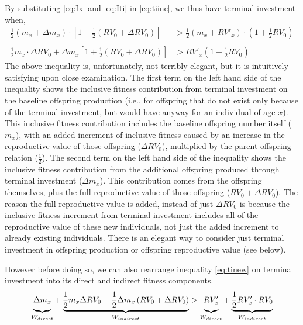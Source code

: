 \documentclass[12pt,review,authoryear]{elsarticle}
\begin{document}
By substituting \eqref{eq:Ix} and \eqref{eq:Iti} in \eqref{eq:tiine}, we thus have terminal investment when,
\begin{equation}\label{eq:tinew}
	\begin{split}
		\frac{1}{2} \left( m_x + \Delta m_{x} \right) \cdot \left[1 + \frac{1}{2} \left( RV_0 + \Delta RV_0 \right) \right] &> \frac{1}{2} \left( m_x + RV'_{x} \right) \cdot \left(1 + \frac{1}{2} RV_0 \right)
		\\ \\
		\frac{1}{2}m_x \cdot \Delta RV_{0} + \Delta m_{x} \left[1 + \frac{1}{2} \left( RV_0 + \Delta RV_0 \right) \right] &> RV'_{x} \left(1 + \frac{1}{2} RV_0 \right) 
	\end{split}
\end{equation} 
The above inequality is, unfortunately, not terribly elegant, but it is intuitively satisfying upon close examination. The first term on the left hand side of the inequality shows the inclusive fitness contribution from terminal investment on the baseline offspring production (i.e., for offspring that do not exist only because of the terminal investment, but would have anyway for an individual of age $x$). This inclusive fitness contribution includes the baseline offspring number itself ($m_{x}$), with an added increment of inclusive fitness caused by an increase in the reproductive value of those offspring ($\Delta RV_{0}$), multiplied by the parent-offspring relation ($\frac{1}{2}$). The second term on the left hand side of the inequality shows the inclusive fitness contribution from the additional offspring produced through terminal investment ($\Delta m_{x}$). This contribution comes from the offspring themselves, plus the full reproductive value of those offspring ($RV_{0} + \Delta RV_{0}$). The reason the full reproductive value is added, instead of just $\Delta RV_{0}$ is because the inclusive fitness increment from terminal investment includes all of the reproductive value of these new individuals, not just the added increment to already existing individuals. There is an elegant way to consider just terminal investment in offspring production or offspring reproductive value (see below).

However before doing so, we can also rearrange inequality \eqref{eq:tinew} on terminal investment into its direct and indirect fitness components.
\begin{equation} \label{eq:tiw}
	\def\tallest{\vphantom{\frac{RV_x}{1}}}
	\underbrace {\Delta m_{x}\tallest }_{W_{direct}} + 
	\underbrace{ \frac{1}{2} m_x \Delta RV_{0} +
		\frac{1}{2} \Delta m_{x} \left( RV_0 + \Delta RV_0 \right) }_{W_{indirect}}  >
	\def\tallest{\vphantom{\frac{RV_x}{1}}}
	\underbrace{ RV'_{x}\tallest }_{W_{direct}} +
	\underbrace{ \frac{1}{2} RV'_{x} \cdot RV_0}_{W_{indirect}} 
\end{equation}
\end{document}
